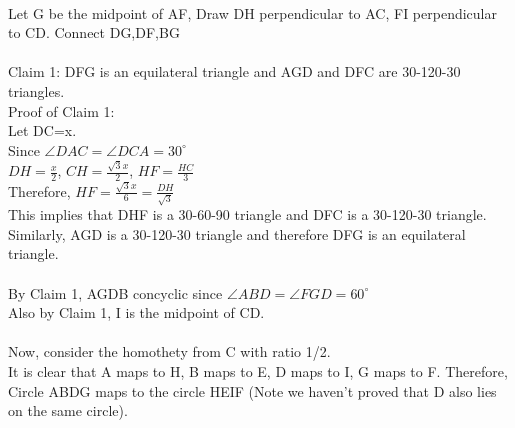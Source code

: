 \documentclass{article}
\begin{document}
\\
Let G be the midpoint of AF, Draw DH perpendicular to AC, FI perpendicular to CD.
Connect DG,DF,BG\\
\\
Claim 1: DFG is an equilateral triangle and AGD and DFC are 30-120-30 triangles.\\
Proof of Claim 1:\\
Let DC=x.\\
Since $\angle DAC = \angle DCA = 30^\circ$\\
$DH=\frac{x}{2}$, $CH = \frac{\sqrt{3}x}{2}$, $HF = \frac{HC}{3}$\\
Therefore, $HF = \frac{\sqrt{3}x}{6} = \frac{DH}{\sqrt{3}}$\\
This implies that DHF is a 30-60-90 triangle and DFC is a 30-120-30 triangle.\\
Similarly, AGD is a 30-120-30 triangle and therefore DFG is an equilateral triangle.\\
\\
By Claim 1, AGDB concyclic since $\angle ABD = \angle FGD = 60^\circ$\\
Also by Claim 1, I is the midpoint of CD.\\
\\
Now, consider the homothety from C with ratio 1/2.\\
It is clear that A maps to H, B maps to E, D maps to I, G maps to F.
Therefore, Circle ABDG maps to the circle HEIF (Note we haven't proved that D also lies on the same circle).\\
\\
\end{document}
